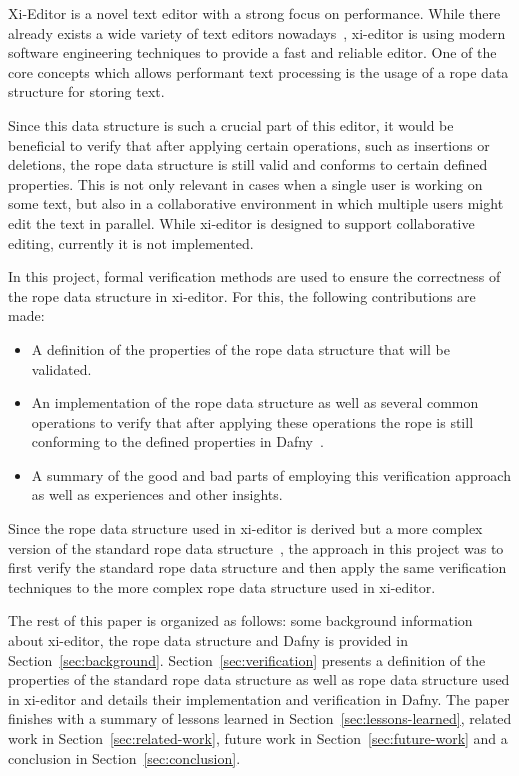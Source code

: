 Xi-Editor is a novel text editor with a strong focus on performance.
While there already exists a wide variety of text editors nowadays~\cite{vi, pike1987text, atom, sublime}, xi-editor is using modern software engineering techniques to provide a fast and reliable editor.
One of the core concepts which allows performant text processing is the usage of a rope data structure for storing text.

Since this data structure is such a crucial part of this editor, it would be beneficial to verify that after applying certain operations, such as insertions or deletions, the rope data structure is still valid and conforms to certain defined properties.
This is not only relevant in cases when a single user is working on some text, but also in a collaborative environment in which multiple users might edit the text in parallel.
While xi-editor is designed to support collaborative editing, currently it is not implemented.

In this project, formal verification methods are used to ensure the correctness of the rope data structure in xi-editor.
For this, the following contributions are made:

\begin{itemize}
	\item A definition of the properties of the rope data structure that will be validated.
	\item An implementation of the rope data structure as well as several common operations to verify that after applying these operations the rope is still conforming to the defined properties in Dafny~\cite{leino2010dafny}.
	\item A summary of the good and bad parts of employing this verification approach as well as experiences and other insights.
\end{itemize}

Since the rope data structure used in xi-editor is derived but a more complex version of the standard rope data structure~\cite{boehm1995ropes}, the approach in this project was to first verify the standard rope data structure and then apply the same verification techniques to the more complex rope data structure used in xi-editor.

The rest of this paper is organized as follows: some background information about xi-editor, the rope data structure and Dafny is provided in Section~\ref{sec:background}.
Section~\ref{sec:verification} presents a definition of the properties of the standard rope data structure as well as rope data structure used in xi-editor and details their implementation and verification in Dafny. 
The paper finishes with a summary of lessons learned in Section~\ref{sec:lessons-learned}, related work in Section~\ref{sec:related-work}, future work in Section~\ref{sec:future-work} and a conclusion in Section~\ref{sec:conclusion}.

